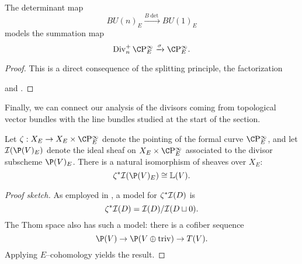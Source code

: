 \begin{corollary}\label{BdetCorollary}
The determinant map \[BU(n)_E \xrightarrow{B\det} BU(1)_E\] models the summation map \[\Div^+_n \CP^\infty_E \xrightarrow{\sigma} \CP^\infty_E.\]
\end{corollary}
\begin{proof}
This is a direct consequence of the splitting principle, the factorization
\begin{center}
\end{center}
and .
\end{proof}

Finally, we can connect our analysis of the divisors coming from topological vector bundles with the line bundles studied at the start of the section.
\begin{lemma}
Let \(\zeta: X_E \to X_E \times \CP^\infty_E\) denote the pointing of the formal curve \(\CP^\infty_E\), and let \(\sheaf I(\P(V)_E)\) denote the ideal sheaf on \(X_E \times \CP^\infty_E\) associated to the divisor subscheme \(\P(V)_E\).  There is a natural isomorphism of sheaves over \(X_E\): \[\zeta^* \sheaf I(\P(V)_E) \cong \ThomSheaf{V}.\]
\end{lemma}
\begin{proof}[Proof sketch]
As employed in , a model for $\zeta^* \mathcal{I}(D)$ is \[\zeta^* \mathcal{I}(D) = \mathcal{I}(D) / \mathcal{I}(D \sqcup 0).\]  The Thom space also has such a model: there is a cofiber sequence \[\P(V) \to \P(V \oplus \mathrm{triv}) \to T(V).\]  Applying $E$--cohomology yields the result.
\end{proof}

